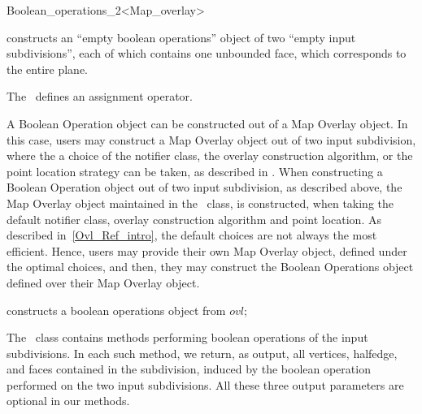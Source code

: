\begin{ccRefClass}{Boolean_operations_2<Map_overlay>}
\ccCreation
    
   {constructs an
     ``empty boolean operations'' object of two ``empty input subdivisions'', 
     each of which contains one unbounded face, which corresponds to the entire plane.}
  
  

The \ccClassTemplateName\ defines an assignment operator.


\begin{ccAdvanced}


A Boolean Operation object can be constructed out of a Map Overlay object.
In this case, users may construct a Map Overlay object out of two input subdivision, 
where the a choice of the notifier class, the overlay construction algorithm, or the point location strategy 
can be taken, as described in . 
When constructing a Boolean Operation object out of two input subdivision, as described above,
the Map Overlay object maintained in the \ccClassTemplateName\ class,
is constructed, when taking the default notifier class, overlay construction algorithm and point location.
As described in~\ref{Ovl_Ref_intro}, the default choices are not always 
the most efficient. Hence, users may provide their own Map Overlay object, defined under the optimal choices, 
and then, they may construct the Boolean Operations object defined over their Map Overlay object. 

{constructs a boolean operations object from $ovl$;}

\end{ccAdvanced}


The \ccClassTemplateName\ class contains methods performing 
boolean operations of the input subdivisions.
In each such method, we return, as output, all vertices, halfedge, and faces 
contained in the subdivision, induced by the boolean operation performed 
on the two input subdivisions. All these three output parameters are optional 
in our methods.


\end{ccRefClass}
